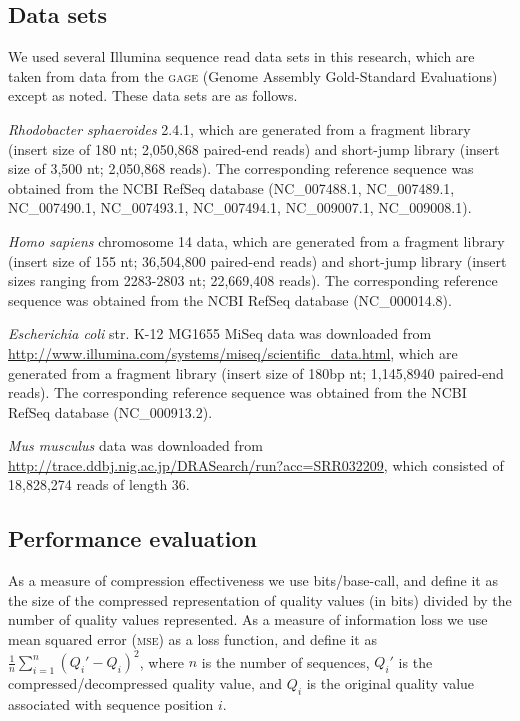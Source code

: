 \documentclass{bioinfo}
\begin{document}
\begin{methods}
\subsection{Data sets}

We used several Illumina sequence read data sets in this research,
which are taken from data from the \textsc{gage} (Genome Assembly
Gold-Standard Evaluations)~\citep{Salzberg:2012rc} except as
noted. These data sets are as follows.

\textit{Rhodobacter sphaeroides} 2.4.1, which are generated from a
fragment library (insert size of 180 nt; 2,050,868 paired-end reads)
and short-jump library (insert size of 3,500 nt; 2,050,868 reads). The
corresponding reference sequence was obtained from the NCBI RefSeq
database (NC\_007488.1, NC\_007489.1, NC\_007490.1, NC\_007493.1,
NC\_007494.1, NC\_009007.1, NC\_009008.1).


\textit{Homo sapiens} chromosome 14 data, which are generated from a
fragment library (insert size of 155 nt; 36,504,800 paired-end reads)
and short-jump library (insert sizes ranging from 2283-2803 nt;
22,669,408 reads). The corresponding reference sequence was obtained
from the NCBI RefSeq database (NC\_000014.8).

\textit{Escherichia coli} str. K-12 MG1655 MiSeq data was downloaded
from \url{http://www.illumina.com/systems/miseq/scientific_data.html},
which are generated from a fragment library (insert size of 180bp nt;
1,145,8940 paired-end reads). The corresponding reference sequence was
obtained from the NCBI RefSeq database (NC\_000913.2).

\textit{Mus musculus} data was downloaded from
\url{http://trace.ddbj.nig.ac.jp/DRASearch/run?acc=SRR032209}, which
consisted of 18,828,274 reads of length 36.

\subsection{Performance evaluation}

As a measure of compression effectiveness we use bits/base-call, and
define it as the size of the compressed representation of quality
values (in bits) divided by the number of quality values represented.
As a measure of information loss we use mean squared error
(\textsc{mse}) as a loss function, and define it as
$\frac{1}{n}\sum_{i=1}^{n}{(Q_i'-Q_i)^2}$, where $n$ is the number of
sequences, $Q_i'$ is the compressed/decompressed quality value, and
$Q_i$ is the original quality value associated with sequence position
$i$.


\end{methods}
\end{document}
